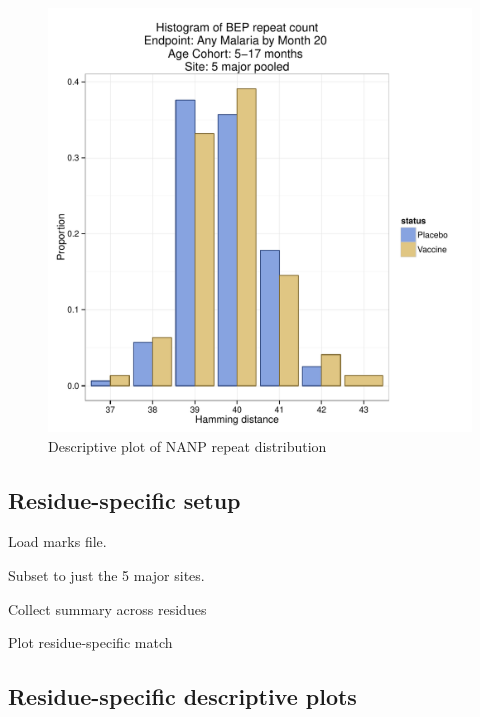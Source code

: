 \documentclass[]{article}
\begin{document}
\begin{figure}[htbp]
\centering
\includegraphics{figures/bep-hist-infant-x-1.pdf}
\caption{Descriptive plot of NANP repeat distribution}
\end{figure}

\subsection{Residue-specific setup}\label{residue-specific-setup}

Load marks file.

Subset to just the 5 major sites.

Collect summary across residues

Plot residue-specific match

\subsection{Residue-specific descriptive
plots}\label{residue-specific-descriptive-plots}
\end{document}
